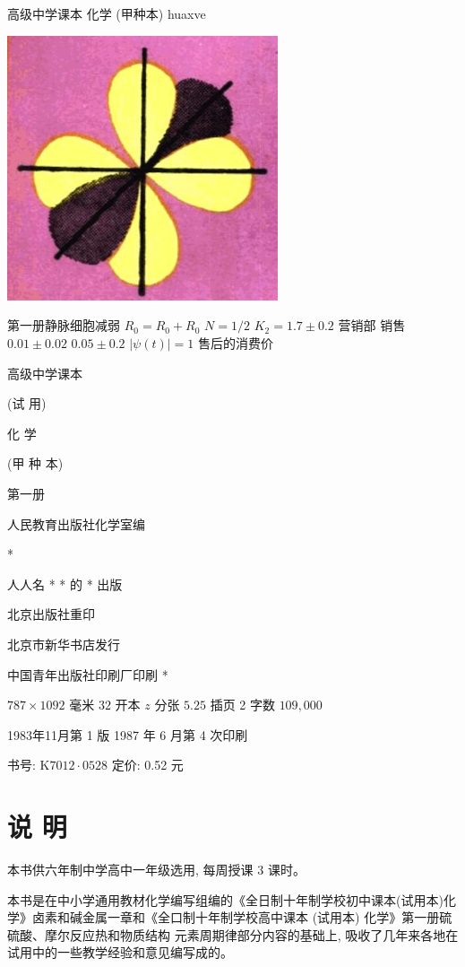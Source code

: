 \documentclass[10pt]{article}
\begin{document}
高级中学课本 化学 (甲种本) huaxve

\begin{center}
\includegraphics[max width=0.6\textwidth]{images/01912d0f-097c-7e75-8f32-4f326cd86c9f_1_847836.jpg}
\end{center}

第一册静脉细胞减弱 \({R}_{0} = {R}_{0} + {R}_{0}\) \(N = 1/2\) \({K}_{2} = {1.7} \pm {0.2}\) 营销部 销售 \({0.01} \pm {0.02}\) \({0.05} \pm {0.2}\) \(\left| {\psi \left( t\right) }\right| = 1\) 售后的消费价

高级中学课本

(试 用)

化 学

(甲 种 本)

第一册

人民教育出版社化学室编

*

人人名 * * 的 * 出版

北京出版社重印

北京市新华书店发行

中国青年出版社印刷厂印刷 *

\({787} \times {1092}\) 毫米 \({32}\) 开本 \(z\) 分张 \({5.25}\) 插页 2 字数 \({109},{000}\)

1983年11月第 1 版 1987 年 6 月第 4 次印刷

书号: \(\mathrm{K}{7012} \cdot {0528}\) 定价: 0.52 元

\section*{说 明}

本书供六年制中学高中一年级选用, 每周授课 3 课时。

本书是在中小学通用教材化学编写组编的《全日制十年制学校初中课本(试用本)化学》卤素和碱金属一章和《全口制十年制学校高中课本 (试用本) 化学》第一册硫 硫酸、摩尔反应热和物质结构 元素周期律部分内容的基础上, 吸收了几年来各地在试用中的一些教学经验和意见编写成的。
\end{document}
